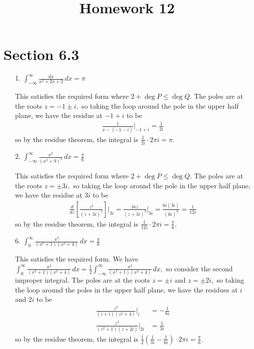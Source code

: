 \documentclass{article}
\begin{document}
\title{Homework 12}
\maketitle
\thispagestyle{fancy}

\section*{Section 6.3}

\begin{itemize}
	\item[1.] $\int_{-\infty}^\infty \frac{dx}{x^2+2x+2}\, dx=\pi$
		\begin{soln}
			This satisfies the required form where $2+\deg P\le\deg Q.$ The poles are at the roots $z=-1\pm i,$ so taking the loop around the pole in the upper half plane, we have the residue at $-1+i$ to be
			\begin{align*}
				\frac{1}{x-(-1-i)}\bigg\vert_{-1+i} = \frac{1}{2i}
			\end{align*}
			so by the residue theorem, the integral is $\frac{1}{2i}\cdot 2\pi i = \pi.$
		\end{soln}

	\item[2.] $\int_{-\infty}^\infty \frac{x^2}{(x^2+9)^2}\, dx=\frac{\pi}{6}$
		\begin{soln}
			This satisfies the required form where $2+\deg P\le \deg Q.$ The poles are at the roots $z=\pm 3i,$ so taking the loop around the pole in the upper half plane, we have the residue at $3i$ to be
			\begin{align*}
				\frac{d}{dz} \left[ \frac{z^2}{(z+3i)^2} \right]\bigg\vert_{3i} = \frac{6iz}{(z+3i)^3}\bigg\vert_{3i} = \frac{6i(3i)}{(6i)^3} = \frac{1}{12i}
			\end{align*}
			so by the residue theorem, the integral is $\frac{1}{12i}\cdot 2\pi i = \frac{\pi}{6}.$
		\end{soln}

	\item[6.] $\int_0^\infty \frac{x^2}{(x^2+1)(x^2+4)}\, dx=\frac{\pi}{6}$
		\begin{soln}
			This satisfies the required form. We have $\int_0^{\infty} \frac{x^2}{(x^2+1)(x^2+4)}\, dx = \frac{1}{2}\int_{-\infty}^\infty \frac{x^2}{(x^2+1)(x^2+4)}\, dx,$ so consider the second improper integral. The poles are at the roots $z=\pm i$ and $z=\pm 2i,$ so taking the loop around the poles in the upper half plane, we have the residues at $i$ and $2i$ to be
			\begin{align*}
				\frac{z^2}{(z+i)(z^2+4)}\bigg\vert_{i} &= -\frac{1}{6i} \\
				\frac{z^2}{(z^2+1)(z+2i)}\bigg\vert_{2i} &= \frac{1}{3i}
			\end{align*}
			so by the residue theorem, the integral is $\frac{1}{2}\left( \frac{1}{3i}-\frac{1}{6i} \right)\cdot 2\pi i = \frac{\pi}{6}.$
		\end{soln}


\end{itemize}
\end{document}
